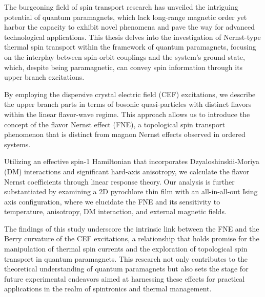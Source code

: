 \documentclass[type=master]{fduthesis}
\begin{document}
\begin{abstract*}
    The burgeoning field of spin transport research has unveiled the intriguing potential of quantum paramagnets, which lack long-range magnetic order yet harbor the capacity to exhibit novel phenomena and pave the way for advanced technological applications. This thesis delves into the investigation of Nernst-type thermal spin transport within the framework of quantum paramagnets, focusing on the interplay between spin-orbit couplings and the system's ground state, which, despite being paramagnetic, can convey spin information through its upper branch excitations.
    
    By employing the dispersive crystal electric field (CEF) excitations, we describe the upper branch parts in terms of bosonic quasi-particles with distinct flavors within the linear flavor-wave regime. This approach allows us to introduce the concept of the flavor Nernst effect (FNE), a topological spin transport phenomenon that is distinct from magnon Nernst effects observed in ordered systems.
    
    Utilizing an effective spin-1 Hamiltonian that incorporates Dzyaloshinskii-Moriya (DM) interactions and significant hard-axis anisotropy, we calculate the flavor Nernst coefficients through linear response theory. Our analysis is further substantiated by examining a 2D pyrochlore thin film with an all-in-all-out Ising axis configuration, where we elucidate the FNE and its sensitivity to temperature, anisotropy, DM interaction, and external magnetic fields.
    
    The findings of this study underscore the intrinsic link between the FNE and the Berry curvature of the CEF excitations, a relationship that holds promise for the manipulation of thermal spin currents and the exploration of topological spin transport in quantum paramagnets. This research not only contributes to the theoretical understanding of quantum paramagnets but also sets the stage for future experimental endeavors aimed at harnessing these effects for practical applications in the realm of spintronics and thermal management.
\end{abstract*}

\end{document}
